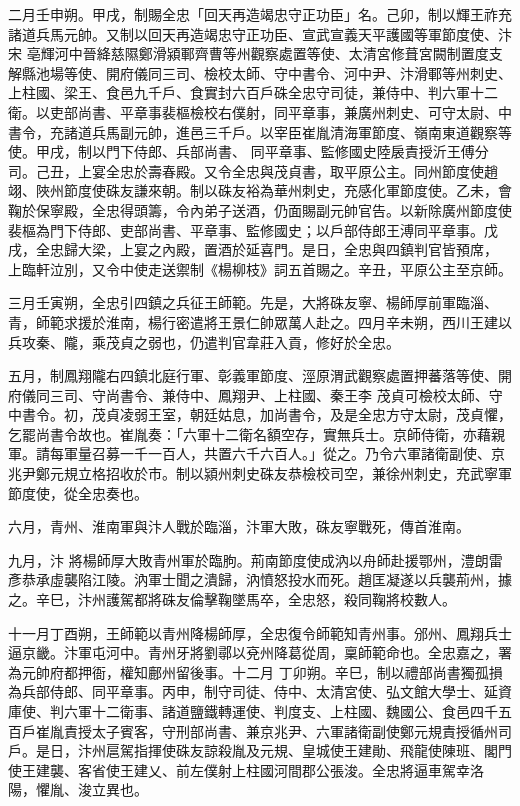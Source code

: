\begin{pinyinscope}
 二月壬申朔。甲戌，制賜全忠「回天再造竭忠守正功臣」名。己卯，制以輝王祚充諸道兵馬元帥。又制以回天再造竭忠守正功臣、宣武宣義天平護國等軍節度使、汴宋
 亳輝河中晉絳慈隰鄭滑潁鄆齊曹等州觀察處置等使、太清宮修葺宮闕制置度支解縣池場等使、開府儀同三司、檢校太師、守中書令、河中尹、汴滑鄆等州刺史、上柱國、梁王、食邑九千戶、食實封六百戶硃全忠守司徒，兼侍中、判六軍十二衛。以吏部尚書、平章事裴樞檢校右僕射，同平章事，兼廣州刺史、可守太尉、中書令，充諸道兵馬副元帥，進邑三千戶。以宰臣崔胤清海軍節度、嶺南東道觀察等使。甲戌，制以門下侍郎、兵部尚書、
 同平章事、監修國史陸扆責授沂王傅分司。己丑，上宴全忠於壽春殿。又令全忠與茂貞書，取平原公主。同州節度使趙翊、陜州節度使硃友謙來朝。制以硃友裕為華州刺史，充感化軍節度使。乙未，會鞠於保寧殿，全忠得頭籌，令內弟子送酒，仍面賜副元帥官告。以新除廣州節度使裴樞為門下侍郎、吏部尚書、平章事、監修國史；以戶部侍郎王溥同平章事。戊戌，全忠歸大梁，上宴之內殿，置酒於延喜門。是日，全忠與四鎮判官皆預席，
 上臨軒泣別，又令中使走送禦制《楊柳枝》詞五首賜之。辛丑，平原公主至京師。



 三月壬寅朔，全忠引四鎮之兵征王師範。先是，大將硃友寧、楊師厚前軍臨淄、青，師範求援於淮南，楊行密遣將王景仁帥眾萬人赴之。四月辛未朔，西川王建以兵攻秦、隴，乘茂貞之弱也，仍遣判官韋莊入貢，修好於全忠。



 五月，制鳳翔隴右四鎮北庭行軍、彰義軍節度、涇原渭武觀察處置押蕃落等使、開府儀同三司、守尚書令、兼侍中、鳳翔尹、上柱國、秦王李
 茂貞可檢校太師、守中書令。初，茂貞凌弱王室，朝廷姑息，加尚書令，及是全忠方守太尉，茂貞懼，乞罷尚書令故也。崔胤奏：「六軍十二衛名額空存，實無兵士。京師侍衛，亦藉親軍。請每軍量召募一千一百人，共置六千六百人。」從之。乃令六軍諸衛副使、京兆尹鄭元規立格招收於市。制以潁州刺史硃友恭檢校司空，兼徐州刺史，充武寧軍節度使，從全忠奏也。



 六月，青州、淮南軍與汴人戰於臨淄，汴軍大敗，硃友寧戰死，傳首淮南。



 九月，汴
 將楊師厚大敗青州軍於臨朐。荊南節度使成汭以舟師赴援鄂州，澧朗雷彥恭承虛襲陷江陵。汭軍士聞之潰歸，汭憤怒投水而死。趙匡凝遂以兵襲荊州，據之。辛巳，汴州護駕都將硃友倫擊鞠墜馬卒，全忠怒，殺同鞠將校數人。



 十一月丁酉朔，王師範以青州降楊師厚，全忠復令師範知青州事。邠州、鳳翔兵士逼京畿。汴軍屯河中。青州牙將劉鄩以兗州降葛從周，稟師範命也。全忠嘉之，署為元帥府都押衙，權知鄜州留後事。十二月
 丁卯朔。辛巳，制以禮部尚書獨孤損為兵部侍郎、同平章事。丙申，制守司徒、侍中、太清宮使、弘文館大學士、延資庫使、判六軍十二衛事、諸道鹽鐵轉運使、判度支、上柱國、魏國公、食邑四千五百戶崔胤責授太子賓客，守刑部尚書、兼京兆尹、六軍諸衛副使鄭元規責授循州司戶。是日，汴州扈駕指揮使硃友諒殺胤及元規、皇城使王建勛、飛龍使陳班、閣門使王建襲、客省使王建乂、前左僕射上柱國河間郡公張浚。全忠將逼車駕幸洛
 陽，懼胤、浚立異也。




\end{pinyinscope}
